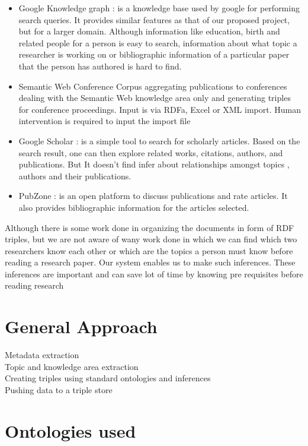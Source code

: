 \documentclass[a4paper,12pt]{article}
\begin{document}
\begin{itemize}
\item Google Knowledge graph \cite{googlekg}: is a knowledge base used by google for performing search queries. It provides similar features as that of our proposed project, but for a larger domain. Although information like education, birth and related people for a person is easy to search, information about what topic a researcher is working on or bibliographic information of a particular paper that the person has authored is hard to find.\\
\item Semantic Web Conference Corpus \cite{swdata} aggregating publications to conferences dealing with the Semantic Web knowledge area only and generating triples for conference proceedings. Input is via RDFa, Excel or XML import. Human intervention is required to input the import file\\
\item Google Scholar : is a simple tool to search for scholarly articles. Based on the search result, one can then explore related works, citations, authors, and publications. But It doesn’t find infer about relationships amongst topics , authors and their publications.\\
\item PubZone\cite{PubZone} :  is an open platform to discuss publications and rate articles. It also provides bibliographic information for the articles selected.\\
\end{itemize}
Although  there is some work done in organizing the documents in form of RDF triples, but we are not aware of wany work done in which we can find which two researchers know each other or which are the topics a person must know before reading a research paper. Our system enables us to make such inferences. These inferences are important and can save lot of time by knowing pre requisites before reading research
\section{General Approach}

Metadata extraction\\
Topic and knowledge area extraction\\
Creating triples using standard ontologies and inferences\\
Pushing data to a triple store

\section{Ontologies used}
\end{document}

